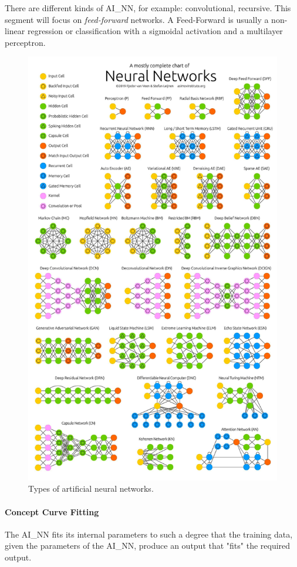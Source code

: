 There are different kinds of \gls{AI_NN}, for example: convolutional, recursive. This segment will focus on \textit{feed-forward} networks. A Feed-Forward is usually a non-linear regression or classification with a sigmoidal activation and a multilayer perceptron.

\begin{figure}[H]
	\centering
	\includegraphics[scale = 0.1]{attachment/chapter_AML/Scc035}
	\caption{Types of artificial neural networks.}
\end{figure}

\paragraph{Concept Curve Fitting}
The \gls{AI_NN} fits its internal parameters to such a degree that the training data, given the parameters of the \gls{AI_NN}, produce an output that "fits" the required output.\\

